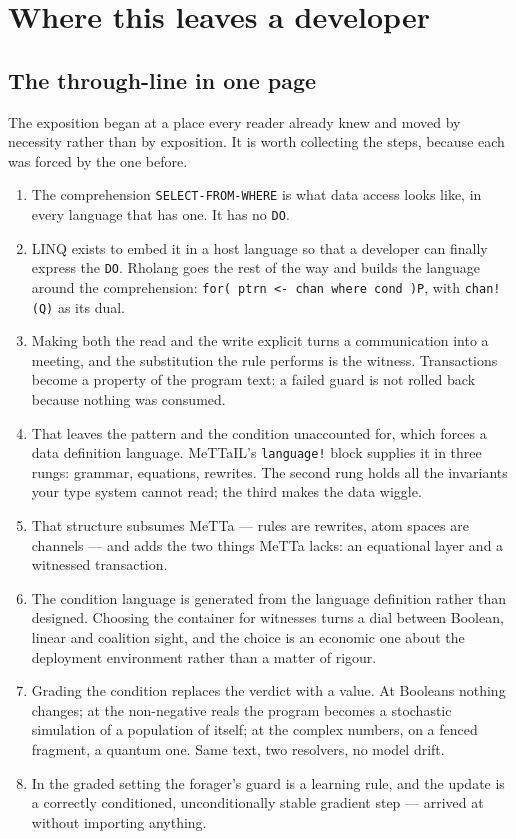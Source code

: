 \section{Where this leaves a developer}
\label{sec:close}

\subsection{The through-line in one page}

The exposition began at a place every reader already knew and moved by
necessity rather than by exposition. It is worth collecting the steps, because
each was forced by the one before.

\begin{enumerate}[leftmargin=1.8em,itemsep=3pt]
\item The comprehension \texttt{SELECT-FROM-WHERE} is what data access looks
  like, in every language that has one. It has no \texttt{DO}.
\item LINQ exists to embed it in a host language so that a developer can finally
  express the \texttt{DO}. Rholang goes the rest of the way and builds the
  language around the comprehension:
  \texttt{for( ptrn <- chan where cond )P}, with \texttt{chan!(Q)} as its dual.
\item Making both the read and the write explicit turns a communication into a
  meeting, and the substitution the rule performs is the witness. Transactions
  become a property of the program text: a failed guard is not rolled back
  because nothing was consumed.
\item That leaves the pattern and the condition unaccounted for, which forces a
  data definition language. MeTTaIL's \texttt{language!} block supplies it in
  three rungs: grammar, equations, rewrites. The second rung holds all the
  invariants your type system cannot read; the third makes the data wiggle.
\item That structure subsumes MeTTa --- rules are rewrites, atom spaces are
  channels --- and adds the two things MeTTa lacks: an equational layer and a
  witnessed transaction.
\item The condition language is generated from the language definition rather
  than designed. Choosing the container for witnesses turns a dial between
  Boolean, linear and coalition sight, and the choice is an economic one about
  the deployment environment rather than a matter of rigour.
\item Grading the condition replaces the verdict with a value. At Booleans
  nothing changes; at the non-negative reals the program becomes a stochastic
  simulation of a population of itself; at the complex numbers, on a fenced
  fragment, a quantum one. Same text, two resolvers, no model drift.
\item In the graded setting the forager's guard is a learning rule, and the
  update is a correctly conditioned, unconditionally stable gradient step ---
  arrived at without importing anything.
\end{enumerate}

